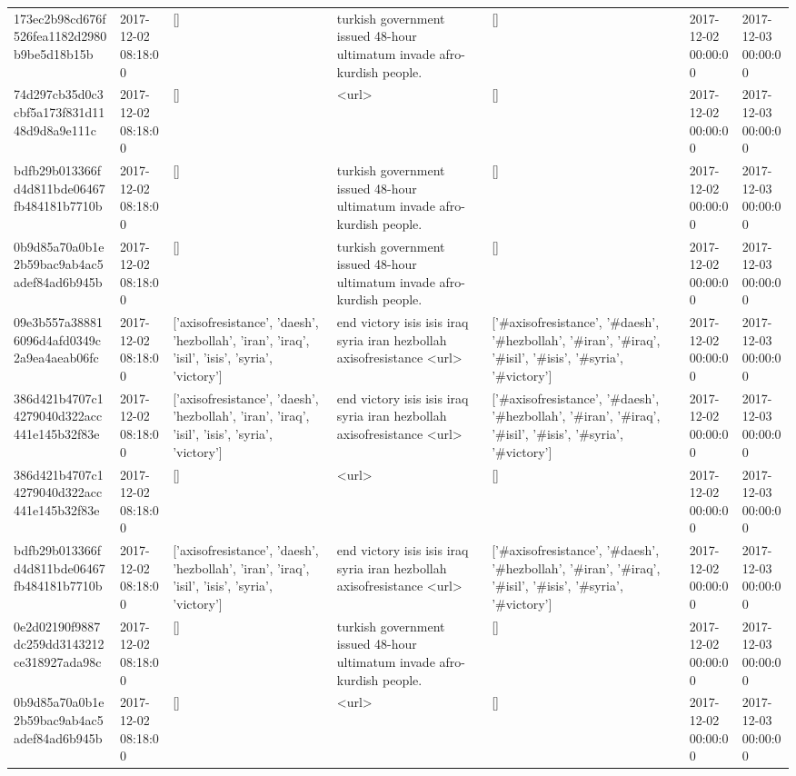 \begin{tabular}{lllllll}
173ec2b98cd676f526fea1182d2980b9be5d18b15b & 2017-12-02 08:18:00 & [] & turkish government issued 48-hour ultimatum invade afro-kurdish people. & [] & 2017-12-02 00:00:00 & 2017-12-03 00:00:00 \\
74d297cb35d0c3cbf5a173f831d1148d9d8a9e111c & 2017-12-02 08:18:00 & [] & <url> & [] & 2017-12-02 00:00:00 & 2017-12-03 00:00:00 \\
bdfb29b013366fd4d811bde06467fb484181b7710b & 2017-12-02 08:18:00 & [] & turkish government issued 48-hour ultimatum invade afro-kurdish people. & [] & 2017-12-02 00:00:00 & 2017-12-03 00:00:00 \\
0b9d85a70a0b1e2b59bac9ab4ac5adef84ad6b945b & 2017-12-02 08:18:00 & [] & turkish government issued 48-hour ultimatum invade afro-kurdish people. & [] & 2017-12-02 00:00:00 & 2017-12-03 00:00:00 \\
09e3b557a388816096d4afd0349c2a9ea4aeab06fc & 2017-12-02 08:18:00 & ['axisofresistance', 'daesh', 'hezbollah', 'iran', 'iraq', 'isil', 'isis', 'syria', 'victory'] & end victory isis isis iraq syria iran hezbollah axisofresistance <url> & ['#axisofresistance', '#daesh', '#hezbollah', '#iran', '#iraq', '#isil', '#isis', '#syria', '#victory'] & 2017-12-02 00:00:00 & 2017-12-03 00:00:00 \\
386d421b4707c14279040d322acc441e145b32f83e & 2017-12-02 08:18:00 & ['axisofresistance', 'daesh', 'hezbollah', 'iran', 'iraq', 'isil', 'isis', 'syria', 'victory'] & end victory isis isis iraq syria iran hezbollah axisofresistance <url> & ['#axisofresistance', '#daesh', '#hezbollah', '#iran', '#iraq', '#isil', '#isis', '#syria', '#victory'] & 2017-12-02 00:00:00 & 2017-12-03 00:00:00 \\
386d421b4707c14279040d322acc441e145b32f83e & 2017-12-02 08:18:00 & [] & <url> & [] & 2017-12-02 00:00:00 & 2017-12-03 00:00:00 \\
bdfb29b013366fd4d811bde06467fb484181b7710b & 2017-12-02 08:18:00 & ['axisofresistance', 'daesh', 'hezbollah', 'iran', 'iraq', 'isil', 'isis', 'syria', 'victory'] & end victory isis isis iraq syria iran hezbollah axisofresistance <url> & ['#axisofresistance', '#daesh', '#hezbollah', '#iran', '#iraq', '#isil', '#isis', '#syria', '#victory'] & 2017-12-02 00:00:00 & 2017-12-03 00:00:00 \\
0e2d02190f9887dc259dd3143212ce318927ada98c & 2017-12-02 08:18:00 & [] & turkish government issued 48-hour ultimatum invade afro-kurdish people. & [] & 2017-12-02 00:00:00 & 2017-12-03 00:00:00 \\
0b9d85a70a0b1e2b59bac9ab4ac5adef84ad6b945b & 2017-12-02 08:18:00 & [] & <url> & [] & 2017-12-02 00:00:00 & 2017-12-03 00:00:00 \\

\end{tabular}
